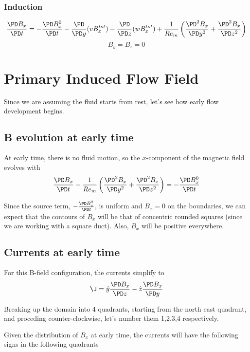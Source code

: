 \documentclass[11pt]{article}
\begin{document}
\subsubsection{Induction}
\begin{equation}
	\frac{\PD B_x}{\PD t}
	=
	- \frac{\PD B_x^0}{\PD t}
	- \frac{\PD}{\PD y} (v B_x^{tot})
	- \frac{\PD}{\PD z} (w B_x^{tot})
	+ \frac{1}{Re_m}
	\left(
	\frac{\PD^2 B_x}{\PD y^2}
	+
	\frac{\PD^2 B_x}{\PD z^2}
	\right)
\end{equation}
\begin{equation}
	B_y = B_z = 0
\end{equation}

\section{Primary Induced Flow Field}
Since we are assuming the fluid starts from rest, let's see how early flow development begins.

\subsection{B evolution at early time}
At early time, there is no fluid motion, so the $x$-component of the magnetic field evolves with
\begin{equation}
	\frac{\PD B_x}{\PD t}
	- \frac{1}{Re_m}
	\left(
	\frac{\PD^2 B_x}{\PD y^2}
	+
	\frac{\PD^2 B_x}{\PD z^2}
	\right)
	=
	- \frac{\PD B_x^0}{\PD t}
\end{equation}

Since the source term, $- \frac{\PD B_x^0}{\PD t}$, is uniform and $B_x=0$ on the boundaries, we can expect that the contours of $B_x$ will be that of concentric rounded squares (since we are working with a square duct). Also, $B_x$ will be positive everywhere.

\subsection{Currents at early time}
For this B-field configuration, the currents simplify to
\begin{equation}
	\J
	=
	\hat{y} \frac{\PD B_x}{\PD z}
	- \hat{z} \frac{\PD B_x}{\PD y}
\end{equation}

Breaking up the domain into 4 quadrants, starting from the north east quadrant, and proceding counter-clockwise, let's number them 1,2,3,4 respectively.

Given the distribution of $B_x$ at early time, the currents will have the following signs in the following quadrants
\end{document}
